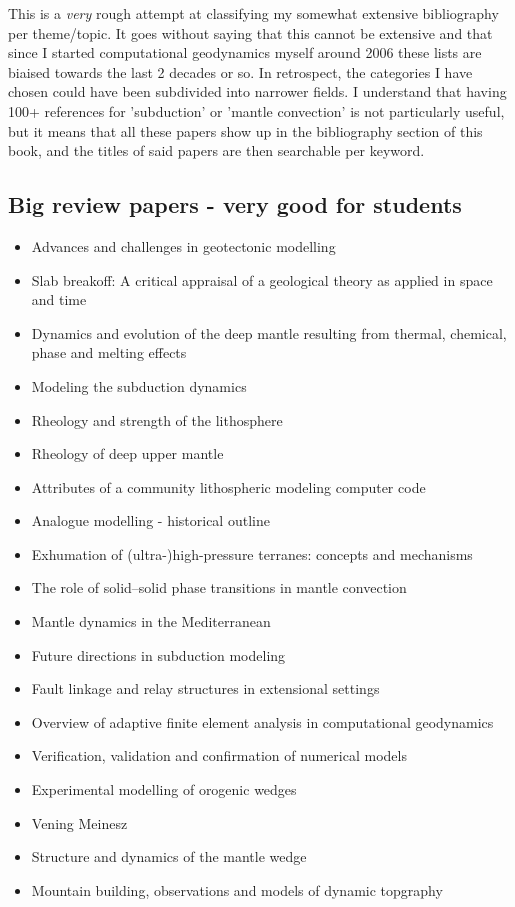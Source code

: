 This is a {\it very} rough attempt at classifying my somewhat extensive 
bibliography per theme/topic.
It goes without saying that this cannot be extensive and that since I 
started computational geodynamics myself around 2006 these lists are 
biaised towards the last 2 decades or so. 
In retrospect, the categories I have chosen could have been subdivided
into narrower fields. I understand that having 100+ references 
for 'subduction'  or 'mantle convection' is not particularly useful, 
but it means that all these papers show up in the bibliography section 
of this book, and the titles of said papers are then searchable per keyword.

\subsection*{Big review papers - very good for students}

\begin{itemize}
\item Advances and challenges in geotectonic modelling \cite{bufy14}
\item Slab breakoff: A critical appraisal of a geological theory as applied in space and time \cite{garm18}
\item Dynamics and evolution of the deep mantle resulting from thermal, chemical, phase and melting effects \cite{tack12}
\item Modeling the subduction dynamics \cite{kinc95,bill08}
\item Rheology and strength of the lithosphere \cite{kirb83,buro11}
\item Rheology of deep upper mantle \cite{kara10}
\item Attributes of a community lithospheric modeling computer code \cite{comc15}
\item Analogue modelling - historical outline \cite{koyi97}
\item Exhumation of (ultra-)high-pressure terranes: concepts and mechanisms \cite{warr13}
\item The role of solid–solid phase transitions in mantle convection \cite{fada17}
\item Mantle dynamics in the Mediterranean \cite{faba14}
\item Future directions in subduction modeling \cite{gery11}
\item Fault linkage and relay structures in extensional settings \cite{foro16}
\item Overview of adaptive finite element analysis in computational geodynamics \cite{masm13}
\item Verification, validation and confirmation of numerical models \cite{orsb94}
\item Experimental modelling of orogenic wedges \cite{grmd12}
\item Vening Meinesz \cite{vlaa89}
\item Structure and dynamics of the mantle wedge \cite{vank03}
\item Mountain building, observations and models of dynamic topgraphy \cite{flgm13,fabc13}

\end{itemize}


